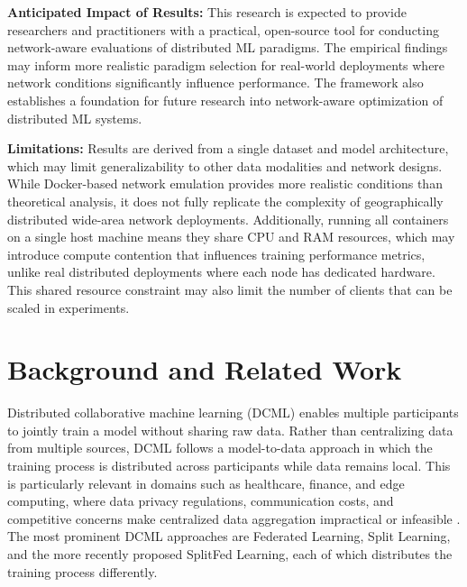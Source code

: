 \documentclass[12pt]{article}
\begin{document}
\textbf{Anticipated Impact of Results:} This research is expected to provide researchers and practitioners with a practical, open-source tool for conducting network-aware evaluations of distributed ML paradigms. The empirical findings may inform more realistic paradigm selection for real-world deployments where network conditions significantly influence performance. The framework also establishes a foundation for future research into network-aware optimization of distributed ML systems.

\textbf{Limitations:} Results are derived from a single dataset and model architecture, which may limit generalizability to other data modalities and network designs. While Docker-based network emulation provides more realistic conditions than theoretical analysis, it does not fully replicate the complexity of geographically distributed wide-area network deployments. Additionally, running all containers on a single host machine means they share CPU and RAM resources, which may introduce compute contention that influences training performance metrics, unlike real distributed deployments where each node has dedicated hardware. This shared resource constraint may also limit the number of clients that can be scaled in experiments.

\section{Background and Related Work}

Distributed collaborative machine learning (DCML) enables multiple participants to jointly train a model without sharing raw data. Rather than centralizing data from multiple sources, DCML follows a model-to-data approach in which the training process is distributed across participants while data remains local. This is particularly relevant in domains such as healthcare, finance, and edge computing, where data privacy regulations, communication costs, and competitive concerns make centralized data aggregation impractical or infeasible \cite{thapa2022}. The most prominent DCML approaches are Federated Learning, Split Learning, and the more recently proposed SplitFed Learning, each of which distributes the training process differently.
\end{document}
